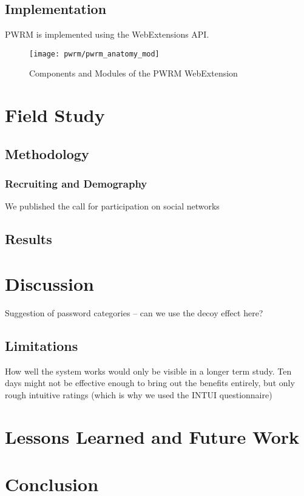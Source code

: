 \subsection{Implementation}
PWRM is implemented using the WebExtensions API. 
\begin{figure}[htbp]
	\centering
	\texttt{[image: pwrm/pwrm\_anatomy\_mod]}
	\caption{\label{fig:pwrm:components} Components and Modules of the PWRM WebExtension}
\end{figure}


\section{Field Study}\label{sec:pwrm:field_study}


\subsection{Methodology}



\subsubsection{Recruiting and Demography}
We published the call for participation on social networks


\subsection{Results}

\section{Discussion}
Suggestion of password categories -- can we use the decoy effect here?

\subsection{Limitations}
How well the system works would only be visible in a longer term study. Ten days might not be effective enough to bring out the benefits entirely, but only rough intuitive ratings (which is why we used the INTUI questionnaire)



\section{Lessons Learned and Future Work}

\section{Conclusion}


